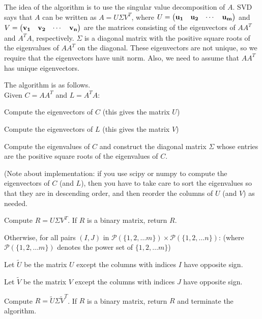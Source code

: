 \documentclass[11pt]{article}
\theoremstyle{definition}
\theoremstyle{remark}
\begin{document}
The idea of the algorithm is to use the singular value decomposition of $A$. SVD says that $A$ can be written as $A = U \Sigma V^{T}$, where 
$U = \begin{pmatrix}
{\bf u_{1}} & {\bf u_{2}} & \cdots & {\bf u_{m}} \\
\end{pmatrix}$ and $V = \begin{pmatrix}
{\bf v_{1}} & {\bf v_{2}} & \cdots & {\bf v_{n}} \\
\end{pmatrix}$ are the matrices consisting of the eigenvectors of $AA^{T}$ and $A^{T}A$, respectively. $\Sigma$ is a diagonal matrix with the positive square roots of the eigenvalues of $AA^{T}$ on the diagonal. These eigenvectors are not unique, so we require that the eigenvectors have unit norm. Also, we need to assume that $AA^{T}$ has unique eigenvectors. 

The algorithm is as follows. \\

\noindent Given $C = AA^{T}$ and $L = A^{T}A$:

	Compute the eigenvectors of $C$ (this gives the matrix $U$)
	
	Compute the eigenvectors of $L$ (this gives the matrix $V$)
	
	Compute the eigenvalues of $C$ and construct the diagonal matrix $\Sigma$ whose entries are the positive square roots of the eigenvalues of $C$.
	
	(Note about implementation: if you use scipy or numpy to compute the eigenvectors of $C$ (and $L$), then you have to take care to sort the eigenvalues so that they are in descending order, and then reorder the columns of $U$ (and $V$) as needed. 
	
	Compute $R = U \Sigma V^{T}$. If $R$ is a binary matrix, return $R$. 
	
	Otherwise, for all pairs $(I, J)$ in $\mathcal{P}(\{1, 2, \ldots m \}) \times \mathcal{P}(\{1, 2, \ldots n \})$: (where $\mathcal{P}(\{1, 2, \ldots m \})$ denotes the power set of $\{1, 2, \ldots m \}$) 
	
\hspace{10pt}	Let $\widetilde{U}$ be the matrix $U$ except the columns with indices $I$ have opposite sign.
	
\hspace{10pt}		Let $\widetilde{V}$ be the matrix $V$ except the columns with indices $J$ have opposite sign.
	
\hspace{10pt}	Compute $R = \widetilde{U} \Sigma \widetilde{V}^{T}$. If $R$ is a binary matrix, return $R$ and terminate the algorithm. 
\end{document}
